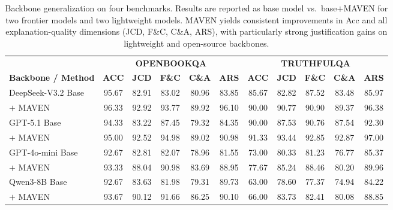\documentclass{article}
\begin{document}
\begin{table}[t]
\caption{Backbone generalization on four benchmarks. Results are reported as base model vs.\ base$+$MAVEN for two frontier models and two lightweight models. MAVEN yields consistent improvements in Acc and all explanation-quality dimensions (JCD, F\&C, C\&A, ARS), with particularly strong justification gains on lightweight and open-source backbones.}
\label{tab:backbone_results}
\centering
\setlength{\tabcolsep}{4pt}

\begin{tabular}{l ccccc ccccc}
\toprule
& \multicolumn{5}{c}{\textbf{OPENBOOKQA}} & \multicolumn{5}{c}{\textbf{TRUTHFULQA}} \\
\cmidrule(lr){2-6} \cmidrule(lr){7-11}
\textbf{Backbone / Method} & \textbf{ACC} & \textbf{JCD} & \textbf{F\&C} & \textbf{C\&A} & \textbf{ARS} & \textbf{ACC} & \textbf{JCD} & \textbf{F\&C} & \textbf{C\&A} & \textbf{ARS} \\
\midrule
DeepSeek-V3.2 Base         & 95.67 & 82.91 & 83.02 & 80.96 & 83.85 & 85.67 & 82.82 & 87.52 & 83.48 & 85.97 \\
\quad $+$ MAVEN       & 96.33 & 92.92 & 93.77 & 89.92 & 96.10 & 90.00 & 90.77 & 90.90 & 89.37 & 96.38 \\
GPT-5.1 Base          & 94.33 & 83.22 & 87.45 & 79.32 & 84.35 & 90.00 & 87.53 & 90.76 & 87.54 & 92.30 \\
\quad $+$ MAVEN       & 95.00 & 92.52 & 94.98 & 89.02 & 90.98 & 91.33 & 93.44 & 92.85 & 92.87 & 97.00 \\
\midrule
GPT-4o-mini Base      & 92.67 & 82.81 & 82.07 & 78.96 & 81.55 & 73.00 & 80.33 & 81.23 & 76.77 & 85.37 \\
\quad $+$ MAVEN       & 93.33 & 88.04 & 90.98 & 83.69 & 88.95 & 77.67 & 85.24 & 88.46 & 80.20 & 89.96 \\
Qwen3-8B Base         & 92.67 & 83.63 & 81.98 & 79.31 & 89.73 & 63.00 & 78.60 & 77.37 & 74.94 & 84.22 \\
\quad $+$ MAVEN       & 93.67 & 90.12 & 91.66 & 86.25 & 90.10 & 66.00 & 83.73 & 82.41 & 80.08 & 88.85 \\
\bottomrule
\end{tabular}


\end{table}
\end{document}
